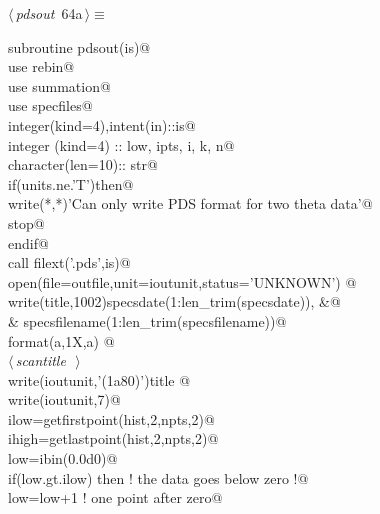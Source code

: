 \documentclass[10pt,a4paper,notitlepage]{article}
\begin{document}
\begin{flushleft} \small
\begin{minipage}{\linewidth}\label{scrap68}\raggedright\small
{} $\langle\,${\it pdsout}\nobreak\ {\footnotesize {64a}}$\,\rangle\equiv$
\vspace{-1ex}
\begin{list}{}{} \item
\mbox{}\verb@       subroutine pdsout(is)@\\
\mbox{}\verb@      use rebin@\\
\mbox{}\verb@      use summation@\\
\mbox{}\verb@      use specfiles@\\
\mbox{}\verb@      integer(kind=4),intent(in)::is@\\
\mbox{}\verb@      integer (kind=4) :: low, ipts, i, k, n@\\
\mbox{}\verb@      character(len=10):: str@\\
\mbox{}\verb@      if(units.ne.'T')then@\\
\mbox{}\verb@        write(*,*)'Can only write PDS format for two theta data'@\\
\mbox{}\verb@        stop@\\
\mbox{}\verb@      endif@\\
\mbox{}\verb@      call filext('.pds',is)@\\
\mbox{}\verb@      open(file=outfile,unit=ioutunit,status='UNKNOWN')    @\\
\mbox{}\verb@      write(title,1002)specsdate(1:len_trim(specsdate)),                &@\\
\mbox{}\verb@     &  specsfilename(1:len_trim(specsfilename))@\\
\mbox{}  format(a,1X,a)      @\\
\mbox{}\verb@@\hbox{$\langle\,${\it scantitle}\nobreak\ {\footnotesize {}}$\,\rangle$}\verb@@\\
\mbox{}\verb@      write(ioutunit,'(1a80)')title      @\\
\mbox{}\verb@      write(ioutunit,7)@\\
\mbox{}\verb@      ilow=getfirstpoint(hist,2,npts,2)@\\
\mbox{}\verb@      ihigh=getlastpoint(hist,2,npts,2)@\\
\mbox{}\verb@      low=ibin(0.0d0)@\\
\mbox{}\verb@      if(low.gt.ilow) then ! the data goes below zero !@\\
\mbox{}\verb@       low=low+1           ! one point after zero@\\

\end{list}
\end{minipage}
\end{flushleft}
\end{document}
